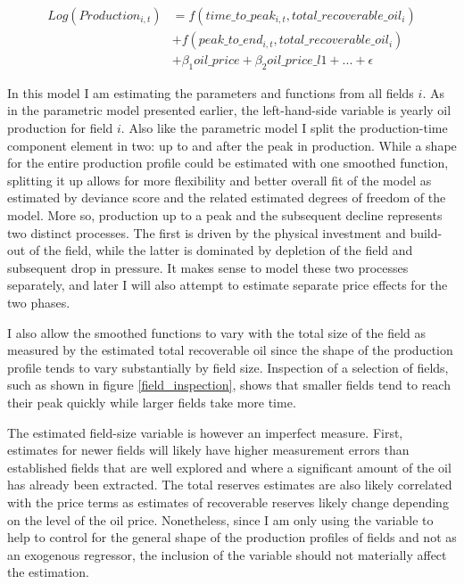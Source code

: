\documentclass[12pt]{article}
\begin{document}
\begin{equation}
\begin{split}

	Log(Production_{i,t}) & = f(time\_to\_peak_{i,t}, total\_recoverable\_oil_i) \\
 	 \quad & + f(peak\_to\_end_{i,t}, total\_recoverable\_oil_i) \\
	 \quad & + \beta_1 oil\_price + \beta_2 oil\_price\_l1 + ... +  \epsilon
\label{gam_price_eqn}
\end{split}
\end{equation}

In this model I am estimating the parameters and functions from all fields $i$. As in the parametric model presented earlier, the left-hand-side variable is yearly oil production for field $i$. Also like the parametric model I split the production-time component element in two: up to and after the peak in production. 
While a shape for the entire production profile could be estimated with one smoothed function, splitting it up allows for more flexibility and better overall fit of the model as estimated by deviance score and the related estimated degrees of freedom of the model.  More so, production up to a peak and the subsequent decline represents two distinct processes.  The first is driven by the physical investment and build-out of the field, while the latter is dominated by depletion of the field and subsequent drop in pressure. It makes sense to model these two processes separately, and later I will also attempt to estimate separate price effects for the two phases. 

I also allow the smoothed functions to vary with the total size of the field as measured by the estimated total recoverable oil since the shape of the production profile tends to vary substantially by field size.  Inspection of a selection of fields, such as shown in figure \ref{field_inspection}, shows that smaller fields tend to reach their peak quickly while larger fields take more time. 

The estimated field-size variable is however an imperfect measure.  First, estimates for newer fields will likely have higher measurement errors than established fields that are well explored and where a significant amount of the oil has already been extracted.  The total reserves estimates are also likely correlated with the price terms as estimates of recoverable reserves likely change depending on the level of the oil price.  Nonetheless, since I am only using the variable to help to control for the general shape of the production profiles of fields and not as an exogenous regressor, the inclusion of the variable should not materially affect the estimation.
\end{document}
